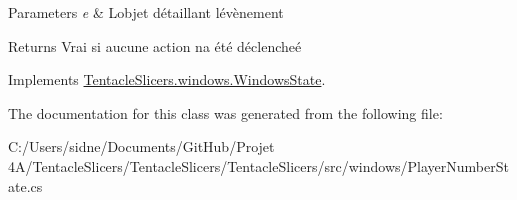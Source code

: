 \begin{DoxyParams}{Parameters}
{\em e} & L\textquotesingle{}objet détaillant l\textquotesingle{}évènement \\
\hline
\end{DoxyParams}
\begin{DoxyReturn}{Returns}
Vrai si aucune action n\textquotesingle{}a été déclencheé 
\end{DoxyReturn}


Implements \hyperlink{class_tentacle_slicers_1_1windows_1_1_windows_state}{Tentacle\+Slicers.\+windows.\+Windows\+State}.



The documentation for this class was generated from the following file\+:\begin{DoxyCompactItemize}
\item 
C\+:/\+Users/sidne/\+Documents/\+Git\+Hub/\+Projet 4\+A/\+Tentacle\+Slicers/\+Tentacle\+Slicers/\+Tentacle\+Slicers/src/windows/Player\+Number\+State.\+cs\end{DoxyCompactItemize}
